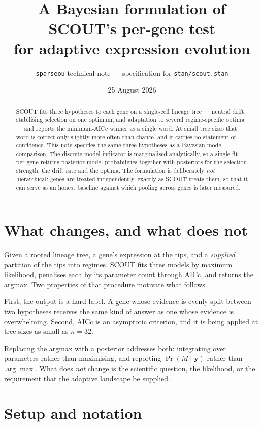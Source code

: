 \documentclass[11pt]{article}
\title{\vspace{-2em}A Bayesian formulation of SCOUT's per-gene test\\for adaptive expression evolution}
\author{\normalsize\texttt{sparseou} technical note --- specification for \texttt{stan/scout.stan}}
\date{\normalsize 25 August 2026}
\newcommand{\yv}{\mathbf{y}}
\begin{document}
\maketitle
\vspace{-1.5em}

\begin{abstract}
\noindent
SCOUT fits three hypotheses to each gene on a single-cell lineage tree --- neutral drift, stabilising
selection on one optimum, and adaptation to several regime-specific optima --- and reports the
minimum-AICc winner as a single word. At small tree sizes that word is correct only slightly more
often than chance, and it carries no statement of confidence. This note specifies the same three
hypotheses as a Bayesian model comparison. The discrete model indicator is marginalised analytically,
so a single fit per gene returns posterior model probabilities together with posteriors for the
selection strength, the drift rate and the optima. The formulation is deliberately \emph{not}
hierarchical: genes are treated independently, exactly as SCOUT treats them, so that it can serve as
an honest baseline against which pooling across genes is later measured.
\end{abstract}

\section{What changes, and what does not}

Given a rooted lineage tree, a gene's expression at the tips, and a \emph{supplied} partition of the
tips into regimes, SCOUT fits three models by maximum likelihood, penalises each by its parameter
count through AICc, and returns the argmax. Two properties of that procedure motivate what follows.

First, the output is a hard label. A gene whose evidence is evenly split between two hypotheses
receives the same kind of answer as one whose evidence is overwhelming. Second, AICc is an asymptotic
criterion, and it is being applied at tree sizes as small as $n = 32$.

Replacing the argmax with a posterior addresses both: integrating over parameters rather than
maximising, and reporting $\Pr(M \mid \yv)$ rather than $\arg\max$. What does \emph{not} change is the
scientific question, the likelihood, or the requirement that the adaptive landscape be supplied.

\section{Setup and notation}
\end{document}
